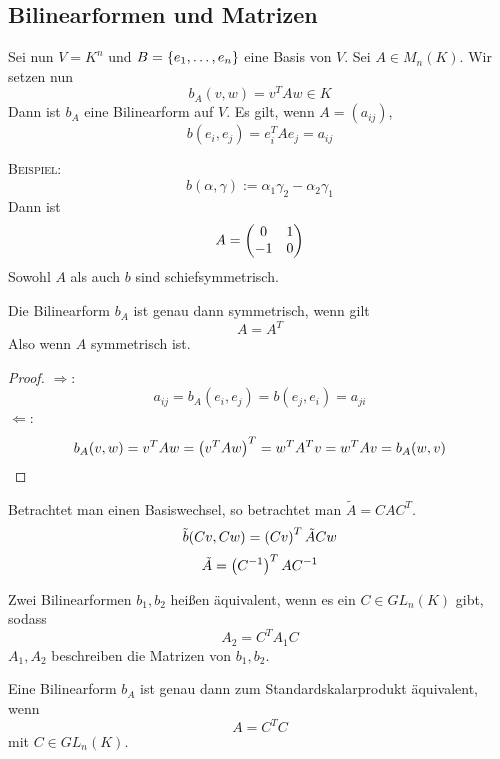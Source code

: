 		\subsection{Bilinearformen und Matrizen} %
		\label{sub:bilinearformen_und_matrizen}
		
			Sei nun $V = K^n$ und $B=\left\{ e_1,\ldots,e_n \right\}$ eine Basis von $V$.
			Sei $A\in M_n(K)$. Wir setzen nun
			\[
				b_A(v,w) = v^TAw \in K
			\]
			Dann ist $b_A$ eine Bilinearform auf $V$.
			Es gilt, wenn $A=(a_{ij})$,
			\[
				b(e_i,e_j) = e_i^TAe_j = a_{ij}
			\]

			\textsc{Beispiel:}\\
			\[
				b(\alpha,\gamma) := \alpha_1\gamma_2 - \alpha_2\gamma_1
			\]
			Dann ist
			\[
				A = \left(  \begin{matrix}
					0 & 1 \\
					-1 & 0
				\end{matrix}  \right)
			\]
			Sowohl $A$ als auch $b$ sind schiefsymmetrisch.

			\begin{lemma}
				Die Bilinearform $b_A$ ist genau dann symmetrisch, wenn gilt
				\[
					A=A^T
				\]
				Also wenn $A$ symmetrisch ist.
			\end{lemma}
			\begin{proof}
				$\Rightarrow$:\\
				\[
					a_{ij} = b_A(e_i,e_j) = b(e_j,e_i) = a_{ji}
				\]
				$\Leftarrow$:\\
				\[
					b_A(v,w) = v^TAw = \left( v^TAw \right)^T = w^TA^Tv = w^TAv = b_A(w,v)
				\]
			\end{proof}

			Betrachtet man einen Basiswechsel, so betrachtet man $\tilde{A}=CAC^T$.
			\[
				\tilde{b}(Cv,Cw) = \left( Cv \right)^T \tilde{A} Cw
			\]
			\[
				\tilde{A} = \left( C^{-1} \right)^T A C^{-1}
			\]

			\begin{definition}
				Zwei Bilinearformen $b_1,b_2$ heißen äquivalent, wenn es ein $C\in GL_n(K)$ gibt, sodass
				\[
					A_2=C^TA_1C
				\]
				$A_1,A_2$ beschreiben die Matrizen von $b_1,b_2$.
			\end{definition}

			\begin{corollary}[Übergangsformel]
				Eine Bilinearform $b_A$ ist genau dann zum Standardskalarprodukt äquivalent, wenn 
				\[
					A=C^TC
				\]
				mit $C\in GL_n(K)$.
			\end{corollary}


